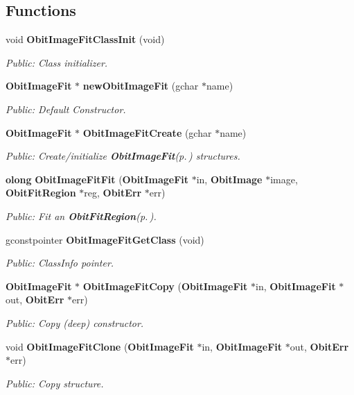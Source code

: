 \subsection*{Functions}
\begin{CompactItemize}
\item 
void {\bf Obit\-Image\-Fit\-Class\-Init} (void)
\begin{CompactList}\small\item\em Public: Class initializer. \item\end{CompactList}\item 
{\bf Obit\-Image\-Fit} $\ast$ {\bf new\-Obit\-Image\-Fit} (gchar $\ast$name)
\begin{CompactList}\small\item\em Public: Default Constructor. \item\end{CompactList}\item 
{\bf Obit\-Image\-Fit} $\ast$ {\bf Obit\-Image\-Fit\-Create} (gchar $\ast$name)
\begin{CompactList}\small\item\em Public: Create/initialize {\bf Obit\-Image\-Fit}{\rm (p.\,\pageref{structObitImageFit})} structures. \item\end{CompactList}\item 
{\bf olong} {\bf Obit\-Image\-Fit\-Fit} ({\bf Obit\-Image\-Fit} $\ast$in, {\bf Obit\-Image} $\ast$image, {\bf Obit\-Fit\-Region} $\ast$reg, {\bf Obit\-Err} $\ast$err)
\begin{CompactList}\small\item\em Public: Fit an {\bf Obit\-Fit\-Region}{\rm (p.\,\pageref{structObitFitRegion})}. \item\end{CompactList}\item 
gconstpointer {\bf Obit\-Image\-Fit\-Get\-Class} (void)
\begin{CompactList}\small\item\em Public: Class\-Info pointer. \item\end{CompactList}\item 
{\bf Obit\-Image\-Fit} $\ast$ {\bf Obit\-Image\-Fit\-Copy} ({\bf Obit\-Image\-Fit} $\ast$in, {\bf Obit\-Image\-Fit} $\ast$out, {\bf Obit\-Err} $\ast$err)
\begin{CompactList}\small\item\em Public: Copy (deep) constructor. \item\end{CompactList}\item 
void {\bf Obit\-Image\-Fit\-Clone} ({\bf Obit\-Image\-Fit} $\ast$in, {\bf Obit\-Image\-Fit} $\ast$out, {\bf Obit\-Err} $\ast$err)
\begin{CompactList}\small\item\em Public: Copy structure. \item\end{CompactList}\end{CompactItemize}


